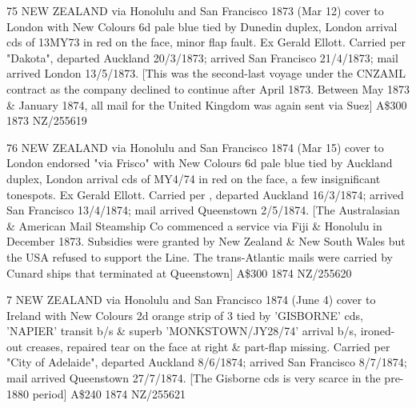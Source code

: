 \documentclass[justified]{tufte-book}
\begin{document}
%
{75
NEW ZEALAND
via Honolulu and San Francisco
1873 (Mar 12) cover to London with New Colours 6d pale blue tied by Dunedin duplex, London arrival cds of 13MY73 in red on the face, minor flap fault. Ex Gerald Ellott. Carried per "Dakota", departed Auckland 20/3/1873; arrived San Francisco 21/4/1873; mail arrived London 13/5/1873. [This was the second-last voyage under the CNZAML contract as the company declined to continue after April 1873. Between May 1873 \& January 1874, all mail for the United Kingdom was again sent via Suez]	
A\$300 }%
{1873}%
{NZ/255619}%
{}%
{}
{}%
{}


%
{76
NEW ZEALAND
via Honolulu and San Francisco
1874 (Mar 15) cover to London endorsed "via Frisco" with New Colours 6d pale blue tied by Auckland duplex, London arrival cds of MY4/74 in red on the face, a few insignificant tonespots. Ex Gerald Ellott. Carried per , departed Auckland 16/3/1874; arrived San Francisco 13/4/1874; mail arrived Queenstown 2/5/1874. [The Australasian \& American Mail Steamship Co commenced a service via Fiji \& Honolulu in December 1873. Subsidies were granted by New Zealand \& New South Wales but the USA refused to support the Line. The trans-Atlantic mails were carried by Cunard ships that terminated at Queenstown]	
A\$300
}%
{1874}%
{NZ/255620}%
{}%
{}
{}%
{}


%
{7
NEW ZEALAND
via Honolulu and San Francisco
1874 (June 4) cover to Ireland with New Colours 2d orange strip of 3 tied by 'GISBORNE' cds, 'NAPIER' transit b/s \& superb 'MONKSTOWN/JY28/74' arrival b/s, ironed-out creases, repaired tear on the face at right \& part-flap missing. Carried per "City of Adelaide", departed Auckland 8/6/1874; arrived San Francisco 8/7/1874; mail arrived Queenstown 27/7/1874. [The Gisborne cds is very scarce in the pre-1880 period]	
A\$240
}%
{1874}%
{NZ/255621}%
{}%
{}
{}%
{}
\end{document}
